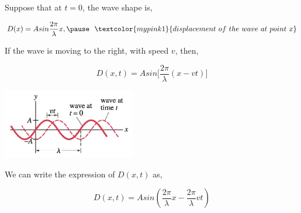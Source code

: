 \documentclass[]{beamer}
\begin{document}
\begin{frame}


Suppose that at $t=0$, the wave shape is,

\pause
\begin{equation*}
D(x)=Asin\frac{2\pi}{\lambda}x, \pause ~~ \textcolor{mypink1}{ displacement~ of ~the ~wave ~at ~point ~x}
\end{equation*}

\pause
 If the wave is moving to the right, with speed $v$, then,

\pause

\begin{equation}
D(x,t)=Asin\big[\frac{2\pi}{\lambda}(x-vt)\big]
\end{equation}

\pause

 \begin{center}
  \includegraphics[height=1.2in]{images4/9.jpg}
\end{center}



  \end{frame}

\begin{frame}


We can write the expression of $D(x,t) $ as,



\begin{equation}
D(x,t)=Asin(\frac{2\pi}{\lambda}x-\frac{2\pi}{\lambda}vt)
\end{equation}





  \end{frame}
\end{document}
